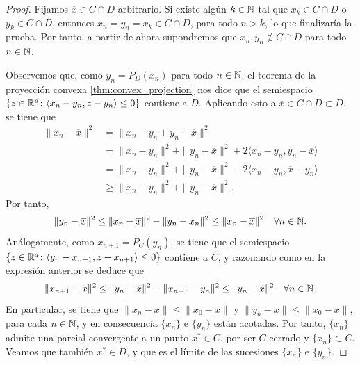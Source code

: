 \begin{proof}
    Fijamos $\overline{x} \in C\cap D$ arbitrario. Si existe algún $k \in \mathbb{N}$ tal que $x_k \in C\cap D$ o $y_k \in C\cap D$, entonces $x_n = y_n = x_k \in C \cap D$, para todo $n > k$, lo que finalizaría la prueba. Por tanto, a partir de ahora supondremos que $x_n,y_n \notin C \cap D$ para todo $n \in \mathbb{N}$.

    Observemos que, como $y_n = P_D(x_n)$ para todo $n \in \mathbb{N}$, el teorema de la proyección convexa \ref{thm:convex_projection} nos dice que el semiespacio $\{ z \in \mathbb{R}^d \colon \langle x_n - y_n, z - y_n \rangle \le 0 \}$ contiene a $D$. Aplicando esto a $\overline{x} \in C\cap D \subset D$, se tiene que
    \begin{equation*}
        \begin{split}
            \|x_n - \overline{x}\|^2 &= \|x_n - y_n + y_n - \overline{x}\|^2 \\
                                     &= \|x_n - y_n\|^2 + \|y_n - \overline{x}\|^2 + 2 \langle x_n - y_n, y_n - \overline{x}\rangle \\
                                     &= \|x_n - y_n\|^2 + \|y_n - \overline{x}\|^2 - 2 \langle x_n - y_n, \overline{x} - y_n\rangle \\
                                     &\ge \|x_n - y_n\|^2 + \|y_n - \overline{x}\|^2. 
        \end{split}
    \end{equation*}
    Por tanto,
    \begin{equation} \label{eq:iter_proj_proof:1}
        \|y_n - \overline{x}\|^2 \le \|x_n - \overline{x}\|^2 - \|y_n - x_n\|^2 \le \|x_n - \overline{x}\|^2 \quad \forall n \in \mathbb{N}.
    \end{equation}
    Análogamente, como $x_{n+1} = P_C(y_n)$, se tiene que el semiespacio $\{ z \in \mathbb{R}^d \colon \langle y_n - x_{n+1}, z - x_{n+1} \rangle \le 0\}$ contiene a $C$, y razonando como en la expresión anterior se deduce que
    \begin{equation} \label{eq:iter_proj_proof:2}
        \|x_{n+1} - \overline{x}\|^2 \le \|y_n - \overline{x}\|^2 - \|x_{n+1} - y_n\|^2 \le \|y_n - \overline{x}\|^2 \quad \forall n \in \mathbb{N}.
    \end{equation}
    En particular, se tiene que $\|x_n - \overline{x}\| \le \|x_0 - \overline{x}\|$ y $\|y_n - \overline{x}\| \le \|x_0 - \overline{x}\|$, para cada $n \in \mathbb{N}$, y en consecuencia $\{x_n\}$ e $\{y_n\}$ están acotadas. Por tanto, $\{x_n\}$ admite una parcial convergente a un punto $x^* \in C$, por ser $C$ cerrado y $\{x_n\} \subset C$. Veamos que también $x^* \in D$, y que es el límite de las sucesiones $\{x_n\}$ e $\{y_n\}$.


\end{proof}
